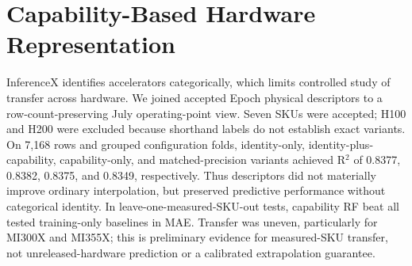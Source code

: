\section{Capability-Based Hardware Representation}
InferenceX identifies accelerators categorically, which limits controlled study
of transfer across hardware. We joined accepted Epoch physical descriptors to a
row-count-preserving July operating-point view. Seven SKUs were accepted; H100
and H200 were excluded because shorthand labels do not establish exact variants.
On 7,168 rows and grouped configuration folds, identity-only, identity-plus-
capability, capability-only, and matched-precision variants achieved R$^2$ of
0.8377, 0.8382, 0.8375, and 0.8349, respectively. Thus descriptors did not
materially improve ordinary interpolation, but preserved predictive performance
without categorical identity. In leave-one-measured-SKU-out tests, capability RF
beat all tested training-only baselines in MAE. Transfer was uneven, particularly
for MI300X and MI355X; this is preliminary evidence for measured-SKU transfer,
not unreleased-hardware prediction or a calibrated extrapolation guarantee.
